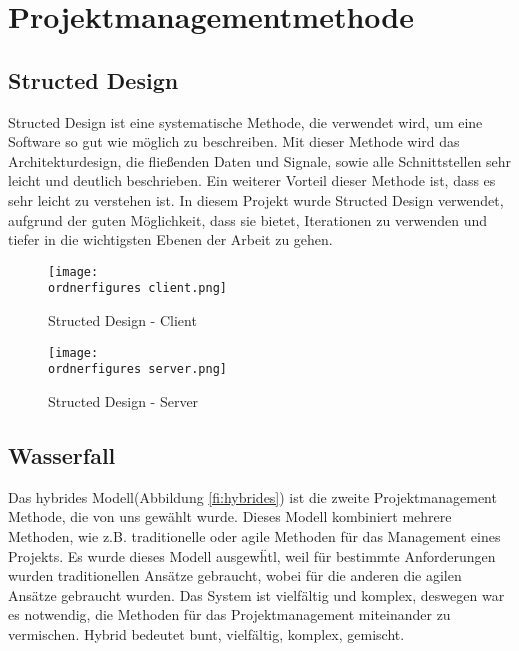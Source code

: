 \section{Projektmanagementmethode}

\subsection{Structed Design}
Structed Design ist eine systematische Methode, die verwendet wird, um eine Software so gut wie m\"{o}glich zu beschreiben. Mit dieser Methode wird das Architekturdesign, die flie\ss{}enden Daten und Signale, sowie alle Schnittstellen sehr leicht und deutlich beschrieben. Ein weiterer Vorteil dieser Methode ist, dass es sehr leicht zu verstehen ist. In diesem Projekt wurde Structed Design verwendet, aufgrund der guten M\"{o}glichkeit, dass sie bietet, Iterationen zu verwenden und tiefer in die wichtigsten Ebenen der Arbeit zu gehen. 



\begin{figure}[h]
	\centering
	\texttt{[image: \\ordnerfigures
		client.png]}
	\caption{Structed Design - Client}
	\label{fi:sd-client}
\end{figure}



\begin{figure}[h]
	
	\centering
	\texttt{[image: \\ordnerfigures
		server.png]}
	\caption{Structed Design - Server}
	\label{fi:sd-server}
\end{figure}


\subsection{Wasserfall}
Das hybrides Modell(Abbildung \ref{fi:hybrides}) ist die zweite Projektmanagement Methode, die von uns gew\"ahlt wurde. Dieses Modell kombiniert mehrere Methoden, wie z.B. traditionelle oder agile Methoden f\"ur das Management eines Projekts. Es wurde dieses Modell ausgew\"htl, weil f\"ur bestimmte Anforderungen wurden traditionellen Ans\"atze gebraucht, wobei f\"ur die anderen die agilen Ans\"atze gebraucht wurden.  Das System ist vielf\"altig und komplex, deswegen war es notwendig, die Methoden f\"ur das Projektmanagement miteinander zu vermischen. Hybrid bedeutet bunt, vielf\"altig, komplex, gemischt. 

